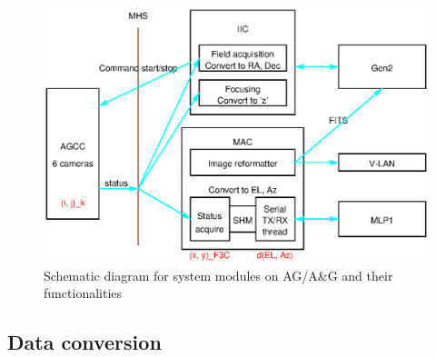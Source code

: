 \documentclass[a4paper,notitlepage]{article}
\begin{document}
\begin{figure}[htb]
  \begin{center}
    \includegraphics{ag_system_modules.eps}
  \end{center}
  \caption{Schematic diagram for system modules on AG/A\&G and their functionalities}
  \label{fig:system_modules}
\end{figure}

\subsection{Data conversion}
\end{document}
